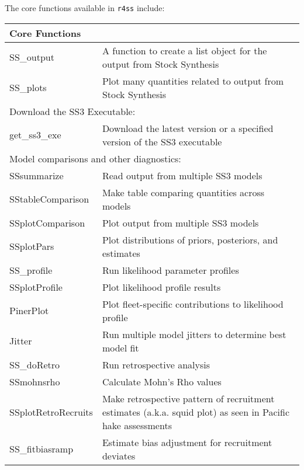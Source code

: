 The core functions available in \texttt{r4ss} include:
\begin{center}
	\begin{longtable}{p{4.5cm} p{10.52cm}}
		\hline
		Core Functions & \Tstrut\Bstrut\\
		\hline
		SS\_output \Tstrut & A function to create a list object for the output from Stock Synthesis \\
		SS\_plots  \Tstrut & Plot many quantities related to output from Stock Synthesis \\
		\hline
		
		\multicolumn{2}{l}{Download the SS3 Executable:} \Tstrut\Bstrut\\
		\hline
		get\_ss3\_exe \Tstrut & Download the latest version or a specified version of the SS3 executable \\
		\hline
	
		\multicolumn{2}{l}{Model comparisons and other diagnostics:} \Tstrut\Bstrut\\
		\hline
		SSsummarize   \Tstrut & Read output from multiple SS3 models \\
		SStableComparison \Tstrut & Make table comparing quantities across models \\
		SSplotComparison \Tstrut & Plot output from multiple SS3 models \\
		SSplotPars    \Tstrut & Plot distributions of priors, posteriors, and estimates \\
		SS\_profile \Tstrut & Run likelihood parameter profiles \\
		SSplotProfile \Tstrut & Plot likelihood profile results \\
		PinerPlot     \Tstrut & Plot fleet-specific contributions to likelihood profile \\
		Jitter \Tstrut & Run multiple model jitters to determine best model fit \\
		SS\_doRetro \Tstrut & Run retrospective analysis \\
		SSmohnsrho \Tstrut & Calculate Mohn's Rho values \\
		SSplotRetroRecruits \Tstrut & Make retrospective pattern of recruitment estimates (a.k.a. squid plot) as seen in Pacific hake assessments\Bstrut \\
		SS\_fitbiasramp \Tstrut & Estimate bias adjustment for recruitment deviates \Bstrut\\
		\hline
		

\end{longtable}
\end{center}
